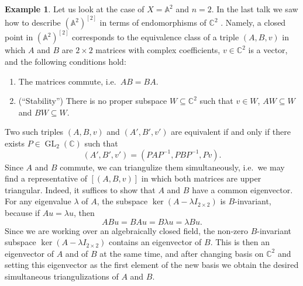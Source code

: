 \documentclass[12pt,a4paper]{amsart}
\theoremstyle{plain}
\theoremstyle{definition}
\newtheorem{exmp}[thm]{Example}
\theoremstyle{remark}
\begin{document}
\begin{exmp}
  Let us look at the case of $X = \mathbb{A}^{2}$ and $n = 2$.
  In the last talk we saw how to describe $(\mathbb{A}^{2})^{[2]}$ in terms of endomorphisms of $\mathbb{C}^{2}$ \cite[Theorem 1.9]{nak99}.
  Namely, a closed point in $(\mathbb{A}^{2})^{[2]}$ corresponds to the equivalence class of a triple $(A,B,v)$ in which $A$ and $B$ are $2 \times 2$ matrices with complex coefficients, $v \in \mathbb{C}^{2}$ is a vector, and the following conditions hold:
  \begin{enumerate}
    \item The matrices commute, i.e.~$AB = BA$.
    \item (``Stability'') There is no proper subspace $W \subseteq \mathbb{C}^{2}$ such that $v \in W$, $AW \subseteq W$ and $BW \subseteq W$.
  \end{enumerate}
  Two such triples $(A,B,v)$ and $(A',B',v')$ are equivalent if and only if there exists $P \in \operatorname{GL}_{2}(\mathbb{C})$ such that
  \[ (A', B', v') = (PAP^{-1}, PBP^{-1}, Pv). \]
  Since $A$ and $B$ commute, we can triangulize them simultaneously, i.e.~we may find a representative of $[(A,B,v)]$ in which both matrices are upper triangular.
  Indeed, it suffices to show that $A$ and $B$ have a common eigenvector.
  For any eigenvalue $\lambda$ of $A$, the subspace $\ker(A -\lambda I_{2 \times 2})$ is $B$-invariant, because if $Au = \lambda u$, then
  \[ ABu = BAu = B\lambda u = \lambda Bu. \]
  Since we are working over an algebraically closed field, the non-zero $B$-invariant subspace $\ker(A - \lambda I_{2 \times 2})$ contains an eigenvector of $B$.
  This is then an eigenvector of $A$ and of $B$ at the same time, and after changing basis on $\mathbb{C}^{2}$ and setting this eigenvector as the first element of the new basis we obtain the desired simultaneous triangulizations of $A$ and $B$.


\end{exmp}
\end{document}
